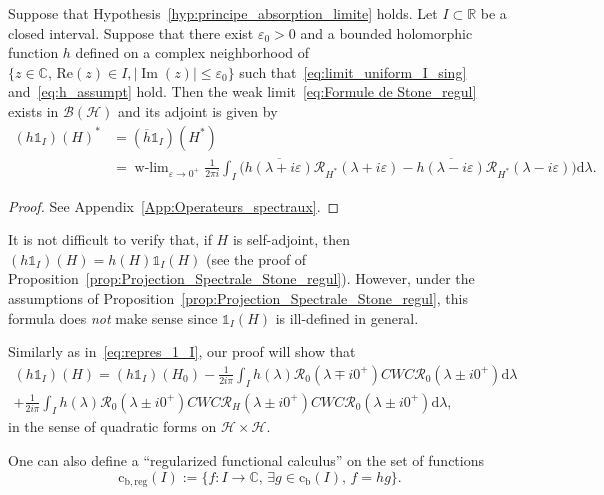 \documentclass[10pt]{amsart}
\theoremstyle{definition}\newtheorem{defi}[theo]{Definition}\newtheorem{rema}[theo]{Remark}\newtheorem{exam}[theo]{Example}\newtheorem{exem}[theo]{Example}\newtheorem{nota}[theo]{Notation}
\newcommand{\Hi}{\mathcal{H}}
\newcommand{\bbC}{\mathbb{C}}
\newcommand{\R}{\mathbb{R}}
\newcommand{\rmc}{\mathrm{c}}
\newcommand{\rmd}{\mathrm{d}}
\newcommand{\rmb}{\mathrm{b}}
\newcommand{\reg}{\mathrm{reg}}
\newcommand{\Res}{\mathcal{R}}
\newcommand{\clB}{\mathcal{B}}
\DeclareMathOperator{\wlim}{w-lim}
\DeclareMathOperator{\im}{Im}
\let\oldexists\exists
\renewcommand*{\exists}{\mathrel{\oldexists}}
\begin{document}
\begin{prop}\label{prop:Projection_Spectrale_Stone_regul}
Suppose that Hypothesis~\ref{hyp:principe_absorption_limite} holds. Let $I\subset\R$ be a closed interval. Suppose that there exist $\varepsilon_0>0$ and a bounded holomorphic function $h$ defined on a complex neighborhood of $\{z\in\bbC,\, \mathrm{Re}(z)\in I, |\im(z)|\le\varepsilon_0\}$ such that~\eqref{eq:limit_uniform_I_sing} and~\eqref{eq:h_assumpt} hold. Then the weak limit~\eqref{eq:Formule de Stone_regul} exists in $\clB(\Hi)$ and its adjoint is given by
\begin{align*}
(h\mathds{1}_I)(H)^*&=(\overline{h}\mathds{1}_I)(H^*)\\
&=\wlim_{\varepsilon\rightarrow 0^+}\frac{1}{2\pi i}\int_I\big(\overline{h(\lambda+i\varepsilon)}\Res_{H^*}(\lambda+i\varepsilon)-\overline{h(\lambda-i\varepsilon)}\Res_{H^*}(\lambda-i\varepsilon)\big)\rmd \lambda.
\end{align*}
\end{prop}


\begin{proof}
See Appendix~\ref{App:Operateurs_spectraux}.
\end{proof}

It is not difficult to verify that, if $H$ is self-adjoint, then $(h \mathds{1}_I)(H)=h(H)\mathds{1}_I(H)$ (see the proof of Proposition~\ref{prop:Projection_Spectrale_Stone_regul}). However, under the assumptions of Proposition~\ref{prop:Projection_Spectrale_Stone_regul}, this formula does \emph{not} make sense since $\mathds{1}_I(H)$ is ill-defined in general.

Similarly as in~\eqref{eq:repres_1_I}, our proof will show that
\begin{multline}\label{eq:repres_1_I_h}
(h \mathds{1}_I)(H) = (h\mathds{1}_I)(H_0) - \frac{1}{2i\pi} \int_I h(\lambda) \Res_{0}(\lambda\mp i0^+)CWC\Res_{0}(\lambda\pm i0^+) \rmd \lambda \\
+ \frac{1}{2i\pi} \int_I h(\lambda) \Res_0(\lambda\pm i0^+) CWC\Res_H(\lambda\pm i0^+)CWC\Res_0(\lambda\pm i0^+) \rmd \lambda, 
\end{multline}
in the sense of quadratic forms on $\Hi\times\Hi$.


One can also define a ``regularized functional calculus'' on the set of functions
\begin{equation*}
\rmc_{\rmb,\reg}(I):=\big\{ f:I\to\bbC, \, \exists g\in \rmc_{\rmb}(I), \, f=hg \}.
\end{equation*}
\end{document}
